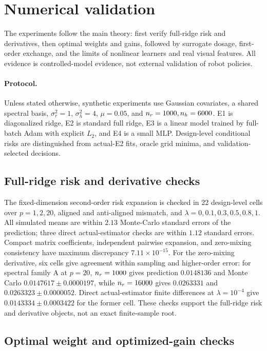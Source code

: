 \section{Numerical validation}
\label{sec:numerics}

The experiments follow the main theory: first verify full-ridge risk and derivatives, then optimal weights and gains, followed by surrogate dosage, first-order exchange, and the limits of nonlinear learners and real visual features. All evidence is controlled-model evidence, not external validation of robot policies.

\paragraph{Protocol.}
Unless stated otherwise, synthetic experiments use Gaussian covariates, a shared spectral basis, $\sigma_r^2=1$, $\sigma_h^2=4$, $\mu=0.05$, and $n_r=1000,n_h=6000$. E1 is diagonalized ridge, E2 is standard full ridge, E3 is a linear model trained by full-batch Adam with explicit $L_2$, and E4 is a small MLP. Design-level conditional risks are distinguished from actual-E2 fits, oracle grid minima, and validation-selected decisions.

\subsection{Full-ridge risk and derivative checks}
\label{sec:numerics-risk}

The fixed-dimension second-order risk expansion is checked in 22 design-level cells over $p=1,2,20$, aligned and anti-aligned mismatch, and $\lambda=0,0.1,0.3,0.5,0.8,1$. All simulated means are within $2.13$ Monte-Carlo standard errors of the prediction; three direct actual-estimator checks are within $1.12$ standard errors. Compact matrix coefficients, independent pairwise expansion, and zero-mixing consistency have maximum discrepancy $7.11\times10^{-15}$.
For the zero-mixing derivative, six cells give agreement within sampling and higher-order error: for spectral family A at $p=20$, $n_r=1000$ gives prediction $0.0148136$ and Monte Carlo $0.0147617\pm0.0000197$, while $n_r=16000$ gives $0.0263331$ and $0.0263323\pm0.0000052$. Direct actual-estimator finite differences at $\lambda=10^{-4}$ give $0.0143334\pm0.0003422$ for the former cell. These checks support the full-ridge risk and derivative objects, not an exact finite-sample root.

\subsection{Optimal weight and optimized-gain checks}
\label{sec:numerics-optimum}

